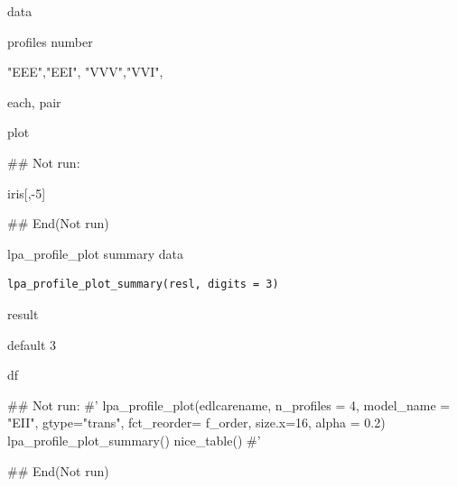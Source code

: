 \documentclass[a4paper]{book}
\begin{document}
%
\begin{Arguments}
\begin{ldescription}
\item[\code{data}] data

\item[\code{n\_profiles}] profiles number

\item[\code{model\_name}] "EEE","EEI", "VVV","VVI",

\item[\code{view}] each, pair
\end{ldescription}
\end{Arguments}
%
\begin{Value}
plot
\end{Value}
%
\begin{Examples}
\begin{ExampleCode}

## Not run: 

iris[,-5] %


## End(Not run)


\end{ExampleCode}
\end{Examples}
%
\begin{Description}
lpa\_profile\_plot summary data
\end{Description}
%
\begin{Usage}
\begin{verbatim}
lpa_profile_plot_summary(resl, digits = 3)
\end{verbatim}
\end{Usage}
%
\begin{Arguments}
\begin{ldescription}
\item[\code{resl}] result

\item[\code{digits}] default 3
\end{ldescription}
\end{Arguments}
%
\begin{Value}
df
\end{Value}
%
\begin{Examples}
\begin{ExampleCode}
## Not run: 
#'
lpa_profile_plot(edlcarename, n_profiles = 4, model_name = "EII", gtype="trans",
                 fct_reorder= f_order,
                 size.x=16, alpha = 0.2)%
  lpa_profile_plot_summary() %
  nice_table()
#'

## End(Not run)

\end{ExampleCode}
\end{Examples}
\end{document}

